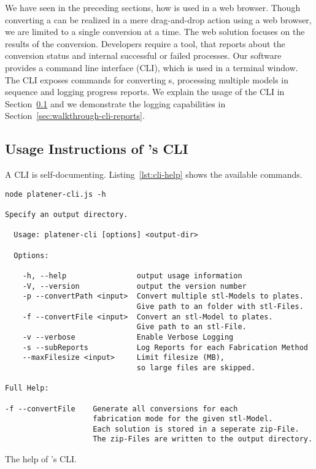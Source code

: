 \documentclass[../ClassicThesis.tex]{subfiles}
\begin{document}
We have seen in the preceding sections, how {\platener} is used in a
web browser.
Though converting a {\threedmodel} can be realized in a mere
drag-and-drop action using a web browser, we are limited to a single
conversion at a time. The web solution focuses on the results of the
conversion. Developers require a tool, that reports about the
conversion status and internal successful or failed processes. Our
software {\platener} provides a command line interface (CLI), which is
used in a terminal window. The CLI exposes commands for converting
{\threedmodel}s, processing multiple models in sequence and logging
progress reports. We explain the usage of the CLI in
Section~\ref{sec:walkthrough-cli-usage} and we demonstrate the logging
capabilities in Section~\ref{sec:walkthrough-cli-reports}.

\subsection{Usage Instructions of {\platener}'s CLI}
\label{sec:walkthrough-cli-usage}

A CLI is self-documenting. Listing~\ref{lst:cli-help} shows the
available commands.

\begin{listing}[!h]
\begin{verbatim}
node platener-cli.js -h

Specify an output directory.

  Usage: platener-cli [options] <output-dir>

  Options:

    -h, --help                output usage information
    -V, --version             output the version number
    -p --convertPath <input>  Convert multiple stl-Models to plates.
                              Give path to an folder with stl-Files.
    -f --convertFile <input>  Convert an stl-Model to plates.
                              Give path to an stl-File.
    -v --verbose              Enable Verbose Logging
    -s --subReports           Log Reports for each Fabrication Method
    --maxFilesize <input>     Limit filesize (MB),
                              so large files are skipped.

Full Help:

-f --convertFile    Generate all conversions for each
                    fabrication mode for the given stl-Model.
                    Each solution is stored in a seperate zip-File.
                    The zip-Files are written to the output directory.
\end{verbatim}
\caption{The help of {\platener}'s CLI.}
\label{lst:cli-help}
\end{listing}
\end{document}
